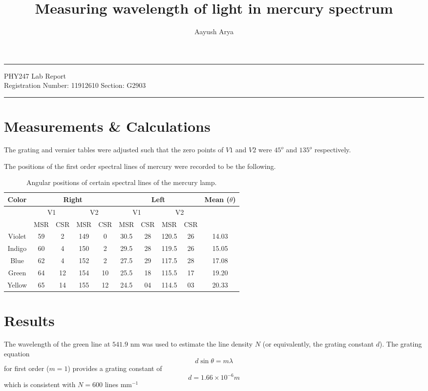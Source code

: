 \documentclass[11pt, a4paper]{article}
\begin{document}
	\author{Aayush Arya}
	\title{Measuring wavelength of light in mercury spectrum}
	\maketitle
	
	\hrule
	\begin{center}
		PHY247 Lab Report\\
		Registration Number: 11912610 \quad Section: G2903
	\end{center}
	\hrule
	
	\section*{Measurements \& Calculations}
	
	The grating and vernier tables were adjusted such that the zero points of $V1$ and $V2$ were $45^o$ and $135^o$ respectively.
	
	The positions of the first order spectral lines of mercury were recorded to be the following.
	
	\begin{table}[h]
		\centering
		\begin{tabular}{|c|c|c|c|c|c|c|c|c|c|}
			\hline
			Color & \multicolumn{4}{|c|}{Right}	&	\multicolumn{4}{|c|}{Left}	& Mean ($\theta$)\\
			\hline
			& \multicolumn{2}{|c|}{V1}  &  \multicolumn{2}{|c|}{V2} & \multicolumn{2}{|c|}{V1} & \multicolumn{2}{|c|}{V2} & \\
			\hline
			 & MSR & CSR & MSR & CSR & MSR & CSR & MSR & CSR & \\
			\hline
			Violet &	59&	2&	149&	0&	30.5&	28&	120.5&	26& 14.03\\
			Indigo &	60&	4&	150&	2&	29.5&	28&	119.5&	26& 15.05\\
			Blue &	62&	4&	152&	2&	27.5&	29&	117.5&	28& 17.08\\
			Green &	64&	12&	154&	10&	25.5&	18&	115.5&	17& 19.20\\
			Yellow&	65&	14&	155&	12&	24.5&	04&	114.5&	03& 20.33\\
			\hline
		\end{tabular}
		\caption{Angular positions of certain spectral lines of the mercury lamp.}
	\end{table}
	
	\section*{Results}
The wavelength of the green line at $541.9$ nm was used to estimate the line density $N$ (or equivalently, the grating constant $d$). The grating equation $$ d\sin\theta = m\lambda$$ for first order ($m=1$) provides a grating constant of $$ d = 1.66 \times 10^{-6} m$$
which is consistent with $N = 600$ lines mm$^{-1}$
	
\end{document}
